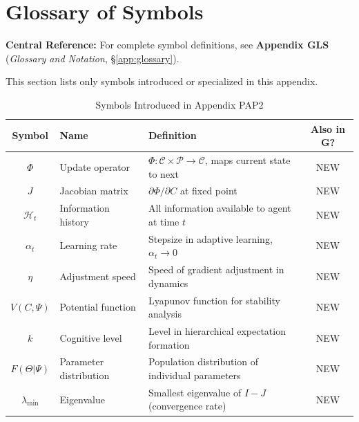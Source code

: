 \section{Glossary of Symbols}
\label{sec:az-glossary}

\begin{tcolorbox}[colback=blue!5!white, colframe=blue!75!black]
\textbf{Central Reference:} For complete symbol definitions, see
\textbf{Appendix GLS} (\textit{Glossary and Notation}, \S\ref{app:glossary}).

This section lists only symbols introduced or specialized in this appendix.
\end{tcolorbox}

\vspace{0.5em}

\begin{table}[htbp]
\centering
\caption{Symbols Introduced in Appendix PAP2}
\label{tab:az-symbols}
\renewcommand{\arraystretch}{1.3}
\begin{tabular}{@{}clp{6cm}c@{}}
\toprule
\textbf{Symbol} & \textbf{Name} & \textbf{Definition} & \textbf{Also in G?} \\
\midrule
$\Phi$ & Update operator & $\Phi: \mathcal{C} \times \mathcal{P} \to \mathcal{C}$, maps current state to next & NEW \\
$J$ & Jacobian matrix & $\partial \Phi / \partial C$ at fixed point & NEW \\
$\mathcal{H}_t$ & Information history & All information available to agent at time $t$ & NEW \\
$\alpha_t$ & Learning rate & Stepsize in adaptive learning, $\alpha_t \to 0$ & NEW \\
$\eta$ & Adjustment speed & Speed of gradient adjustment in dynamics & NEW \\
$V(C, \Psi)$ & Potential function & Lyapunov function for stability analysis & NEW \\
$k$ & Cognitive level & Level in hierarchical expectation formation & NEW \\
$F(\Theta | \Psi)$ & Parameter distribution & Population distribution of individual parameters & NEW \\
$\lambda_{\min}$ & Eigenvalue & Smallest eigenvalue of $I - J$ (convergence rate) & NEW \\
\bottomrule
\end{tabular}
\end{table}


